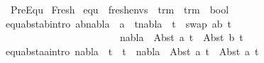 %
\begin{isabellebody}%
%
%
\isadelimtheory
%
\endisadelimtheory
%
\isatagtheory
{}\isamarkupfalse%
\ PreEqu\isanewline
\isanewline
{}\ Fresh\isanewline
\isanewline
{}%
\endisatagtheory
{\isafoldtheory}%
%
\isadelimtheory
\isanewline
%
\endisadelimtheory
\isanewline
\isanewline
{}\isamarkupfalse%
\ equ\ {\isacharcolon}{\kern0pt}{\isacharcolon}{\kern0pt}\ {\isachardoublequoteopen}fresh{\isacharunderscore}{\kern0pt}envs\ {\isasymRightarrow}\ trm\ {\isasymRightarrow}\ trm\ {\isasymRightarrow}\ bool{\isachardoublequoteclose}\ {\isacharparenleft}{\kern0pt}{\isachardoublequoteopen}\ {\isacharunderscore}{\kern0pt}\ {\isasymturnstile}\ {\isacharunderscore}{\kern0pt}\ {\isasymapprox}\ {\isacharunderscore}{\kern0pt}{\isachardoublequoteclose}\ {\isacharbrackleft}{\kern0pt}{}{}{\isacharcomma}{\kern0pt}{}{}{\isacharcomma}{\kern0pt}{}{}{\isacharbrackright}{\kern0pt}\ {}{}{\isacharparenright}{\kern0pt}\ \isanewline
equ{\isacharunderscore}{\kern0pt}abst{\isacharunderscore}{\kern0pt}ab{\isacharbrackleft}{\kern0pt}intro{\isacharbang}{\kern0pt}{\isacharbrackright}{\kern0pt}{\isacharcolon}{\kern0pt}\ {\isachardoublequoteopen}{\isasymlbrakk}a{\isasymnoteq}b{\isacharsemicolon}{\kern0pt}{\isacharparenleft}{\kern0pt}nabla\ {\isasymturnstile}\ a\ {\isasymsharp}\ t{}{\isacharparenright}{\kern0pt}{\isacharsemicolon}{\kern0pt}{\isacharparenleft}{\kern0pt}nabla\ {\isasymturnstile}\ t{}\ {\isasymapprox}\ {\isacharparenleft}{\kern0pt}swap\ {\isacharbrackleft}{\kern0pt}{\isacharparenleft}{\kern0pt}a{\isacharcomma}{\kern0pt}b{\isacharparenright}{\kern0pt}{\isacharbrackright}{\kern0pt}\ t{}{\isacharparenright}{\kern0pt}{\isacharparenright}{\kern0pt}{\isasymrbrakk}\ \isanewline
\ \ \ \ \ \ \ \ \ \ \ \ \ \ \ \ \ \ \ \ \ \ {\isasymLongrightarrow}\ {\isacharparenleft}{\kern0pt}nabla\ {\isasymturnstile}\ Abst\ a\ t{}\ {\isasymapprox}\ Abst\ b\ t{}{\isacharparenright}{\kern0pt}{\isachardoublequoteclose}\ {\isacharbar}{\kern0pt}\isanewline
equ{\isacharunderscore}{\kern0pt}abst{\isacharunderscore}{\kern0pt}aa{\isacharbrackleft}{\kern0pt}intro{\isacharbang}{\kern0pt}{\isacharbrackright}{\kern0pt}{\isacharcolon}{\kern0pt}\ {\isachardoublequoteopen}{\isacharparenleft}{\kern0pt}nabla\ {\isasymturnstile}\ t{}\ {\isasymapprox}\ t{}{\isacharparenright}{\kern0pt}\ {\isasymLongrightarrow}\ {\isacharparenleft}{\kern0pt}nabla\ {\isasymturnstile}\ Abst\ a\ t{}\ {\isasymapprox}\ Abst\ a\ t{}{\isacharparenright}{\kern0pt}{\isachardoublequoteclose}\ {\isacharbar}{\kern0pt}\isanewline

\end{isabellebody}
